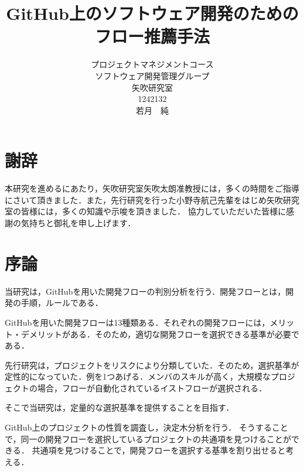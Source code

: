 \title{GitHub上のソフトウェア開発のためのフロー推薦手法}
\author{プロジェクトマネジメントコース\\
ソフトウェア開発管理グループ\\
矢吹研究室\\
1242132\\
若月　純}
\date{}

\maketitle


\chapter*{謝辞}

本研究を進めるにあたり，矢吹研究室矢吹太朗准教授には，多くの時間をご指導にさいて頂きました．また，先行研究を行った小野寺航己先輩をはじめ矢吹研究室の皆様には，多くの知識や示唆を頂きました．
協力していただいた皆様に感謝の気持ちと御礼を申し上げます．


\tableofcontents%

\chapter{序論}
当研究は，GitHubを用いた開発フローの判別分析を行う．開発フローとは，開発の手順，ルールである．

GitHubを用いた開発フローは13種類ある．それぞれの開発フローには，メリット・デメリットがある．そのため，適切な開発フローを選択できる基準が必要である．


先行研究は，プロジェクトをリスクにより分類していた．そのため，選択基準が定性的になっていた．例を1つあげる．メンバのスキルが高く，大規模なプロジェクトの場合，フローが自動化されているイストフローが選択される\cite{onodera2015}．

そこで当研究は，定量的な選択基準を提供することを目指す．

GitHub上のプロジェクトの性質を調査し，決定木分析を行う．
そうすることで，同一の開発フローを選択しているプロジェクトの共通項を見つけることができる．
共通項を見つけることで，開発フローを選択する基準を割り出せると考える．




